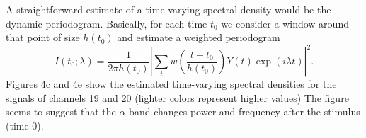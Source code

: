 A straightforward estimate of a time-varying spectral density
would be the dynamic periodogram. Basically, for each time $t_0$
we consider a window around that point of size $h(t_0)$ and
estimate a weighted periodogram
\[
I(t_0;\lambda) = \frac{1}{2\pi h(t_0)} \left| \sum_t
w\left(\frac{t-t_0}{h(t_0)}\right) Y(t) \exp(i\lambda t) \right|^2.
\]
Figures 4c and 4e show the estimated time-varying spectral
densities for the signals of channels 19 and 20 (lighter colors
represent higher values)
The figure seems to suggest that the $\alpha$ band changes power
and frequency after the stimulus (time 0).


\centerline{}
\centerline{}
\centerline{}

